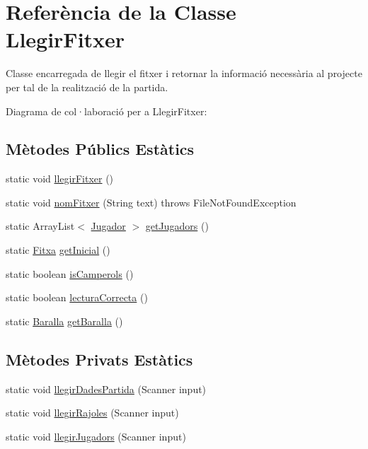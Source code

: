 \hypertarget{class_llegir_fitxer}{}\section{Referència de la Classe Llegir\+Fitxer}
\label{class_llegir_fitxer}


Classe encarregada de llegir el fitxer i retornar la informació necessària al projecte per tal de la realització de la partida.  




Diagrama de col·laboració per a Llegir\+Fitxer\+:
\subsection*{Mètodes Públics Estàtics}
\begin{DoxyCompactItemize}
\item 
static void \mbox{\hyperlink{class_llegir_fitxer_a821a8ff7021fb5faac6ff4297bb00b61}{llegir\+Fitxer}} ()
\item 
static void \mbox{\hyperlink{class_llegir_fitxer_a68f9ae473ab16632116b8c13ed16fff5}{nom\+Fitxer}} (String text)  throws File\+Not\+Found\+Exception 
\item 
static Array\+List$<$ \mbox{\hyperlink{class_jugador}{Jugador}} $>$ \mbox{\hyperlink{class_llegir_fitxer_a0917d49b907c21ed5a904ddd818372b9}{get\+Jugadors}} ()
\item 
static \mbox{\hyperlink{class_fitxa}{Fitxa}} \mbox{\hyperlink{class_llegir_fitxer_afce4c62bf6cf65bf2e719edee92b15b2}{get\+Inicial}} ()
\item 
static boolean \mbox{\hyperlink{class_llegir_fitxer_a72bf8be585313571b794f533c5a6b449}{is\+Camperols}} ()
\item 
static boolean \mbox{\hyperlink{class_llegir_fitxer_a3e7c849571e7eeff4b0f9efc2f70b5ac}{lectura\+Correcta}} ()
\item 
static \mbox{\hyperlink{class_baralla}{Baralla}} \mbox{\hyperlink{class_llegir_fitxer_a931dfb14e0ddc1fd9b3db85d085ebceb}{get\+Baralla}} ()
\end{DoxyCompactItemize}
\subsection*{Mètodes Privats Estàtics}
\begin{DoxyCompactItemize}
\item 
static void \mbox{\hyperlink{class_llegir_fitxer_adeec6b2bd6754481b94c815b82e5bbce}{llegir\+Dades\+Partida}} (Scanner input)
\item 
static void \mbox{\hyperlink{class_llegir_fitxer_ac73d2ac3cbe198bd2ab5c6e1f5b4ead2}{llegir\+Rajoles}} (Scanner input)
\item 
static void \mbox{\hyperlink{class_llegir_fitxer_addb0fed99c782e84a9b670f89c3eecd2}{llegir\+Jugadors}} (Scanner input)
\end{DoxyCompactItemize}
